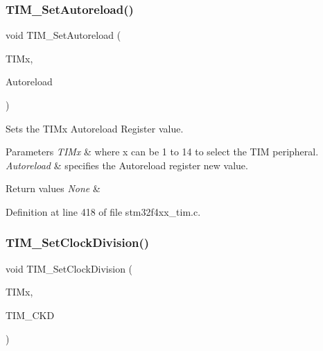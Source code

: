 \subsubsection{\texorpdfstring{T\+I\+M\+\_\+\+Set\+Autoreload()}{TIM\_SetAutoreload()}}
{\footnotesize\ttfamily void T\+I\+M\+\_\+\+Set\+Autoreload (\begin{DoxyParamCaption}\item[{\hyperlink{struct_t_i_m___type_def}{T\+I\+M\+\_\+\+Type\+Def} $\ast$}]{T\+I\+Mx,  }\item[{uint32\+\_\+t}]{Autoreload }\end{DoxyParamCaption})}



Sets the T\+I\+Mx Autoreload Register value. 


\begin{DoxyParams}{Parameters}
{\em T\+I\+Mx} & where x can be 1 to 14 to select the T\+IM peripheral. \\
\hline
{\em Autoreload} & specifies the Autoreload register new value. \\
\hline
\end{DoxyParams}

\begin{DoxyRetVals}{Return values}
{\em None} & \\
\hline
\end{DoxyRetVals}


Definition at line 418 of file stm32f4xx\+\_\+tim.\+c.

\mbox{\label{group___t_i_m_ga20ef804dc32c723662d11ee7da3baab2}} 
\subsubsection{\texorpdfstring{T\+I\+M\+\_\+\+Set\+Clock\+Division()}{TIM\_SetClockDivision()}}
{\footnotesize\ttfamily void T\+I\+M\+\_\+\+Set\+Clock\+Division (\begin{DoxyParamCaption}\item[{\hyperlink{struct_t_i_m___type_def}{T\+I\+M\+\_\+\+Type\+Def} $\ast$}]{T\+I\+Mx,  }\item[{uint16\+\_\+t}]{T\+I\+M\+\_\+\+C\+KD }\end{DoxyParamCaption})}



